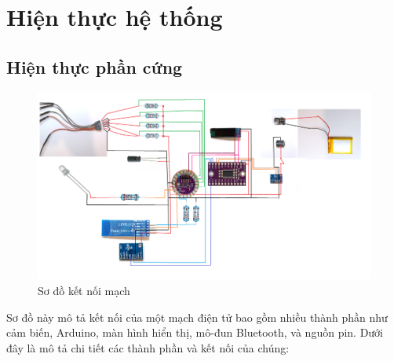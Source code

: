 \section{Hiện thực hệ thống}
\subsection{Hiện thực phần cứng}
\begin{figure}[H]
    \centering
    \includegraphics[width=\textwidth,height=\textheight,keepaspectratio]{Images/SystemImpl/schematic.png}
    \caption{Sơ đồ kết nối mạch}
    \label{fig:enter-label}
\end{figure}
Sơ đồ này mô tả kết nối của một mạch điện tử bao gồm nhiều thành phần như cảm biến, Arduino, màn hình hiển thị, mô-đun Bluetooth, và nguồn pin. Dưới đây là mô tả chi tiết các thành phần và kết nối của chúng:
